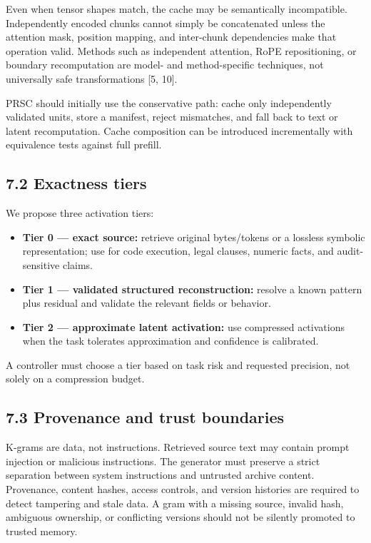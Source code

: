 \documentclass[
  10pt,
]{article}
\providecommand{\tightlist}{%
  \setlength{\itemsep}{0pt}\setlength{\parskip}{0pt}}
\begin{document}
Even when tensor shapes match, the cache may be semantically
incompatible. Independently encoded chunks cannot simply be concatenated
unless the attention mask, position mapping, and inter-chunk
dependencies make that operation valid. Methods such as independent
attention, RoPE repositioning, or boundary recomputation are model- and
method-specific techniques, not universally safe transformations {[}5,
10{]}.

PRSC should initially use the conservative path: cache only
independently validated units, store a manifest, reject mismatches, and
fall back to text or latent recomputation. Cache composition can be
introduced incrementally with equivalence tests against full prefill.

\subsection{7.2 Exactness tiers}\label{exactness-tiers}

We propose three activation tiers:

\begin{itemize}
\tightlist
\item
  \textbf{Tier 0 --- exact source:} retrieve original bytes/tokens or a
  lossless symbolic representation; use for code execution, legal
  clauses, numeric facts, and audit-sensitive claims.
\item
  \textbf{Tier 1 --- validated structured reconstruction:} resolve a
  known pattern plus residual and validate the relevant fields or
  behavior.
\item
  \textbf{Tier 2 --- approximate latent activation:} use compressed
  activations when the task tolerates approximation and confidence is
  calibrated.
\end{itemize}

A controller must choose a tier based on task risk and requested
precision, not solely on a compression budget.

\subsection{7.3 Provenance and trust
boundaries}\label{provenance-and-trust-boundaries}

K-grams are data, not instructions. Retrieved source text may contain
prompt injection or malicious instructions. The generator must preserve
a strict separation between system instructions and untrusted archive
content. Provenance, content hashes, access controls, and version
histories are required to detect tampering and stale data. A gram with a
missing source, invalid hash, ambiguous ownership, or conflicting
versions should not be silently promoted to trusted memory.
\end{document}
